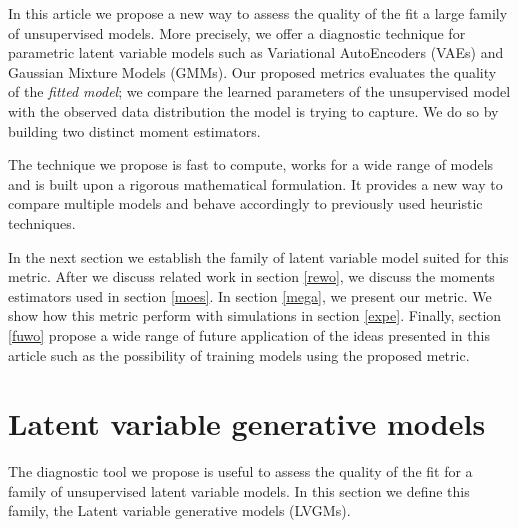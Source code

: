 \documentclass{article}
\begin{document}
\bigskip

In this article we propose a new way to assess the quality of the fit a large family of unsupervised models. More precisely, we offer a diagnostic technique for parametric latent variable models such as Variational AutoEncoders (VAEs) \cite{Kingma13,Kingma17} and Gaussian Mixture Models (GMMs). Our proposed metrics evaluates the quality of the \textit{fitted model}; we compare the learned parameters of the unsupervised model with the observed data distribution the model is trying to capture. We do so by building two distinct moment estimators. 

\bigskip

The technique we propose is fast to compute, works for a wide range of models and is built upon a rigorous mathematical formulation. It provides a new way to compare multiple models and behave accordingly to previously used heuristic techniques.

\bigskip

In the next section we establish the family of latent variable model suited for this metric. After we discuss related work in section \ref{rewo}, we discuss the moments estimators used in section \ref{moes}.  In section \ref{mega}, we present our metric. We show how this metric perform with simulations in section \ref{expe}. Finally, section \ref{fuwo} propose a wide range of future application of the ideas presented in this article such as the possibility of training models using the proposed metric. 

\section{Latent variable generative models}\label{lvgm}

The diagnostic tool we propose is useful to assess the quality of the fit for a family of unsupervised latent variable models. In this section we define this family, the Latent variable generative models (LVGMs).

\bigskip
\end{document}
